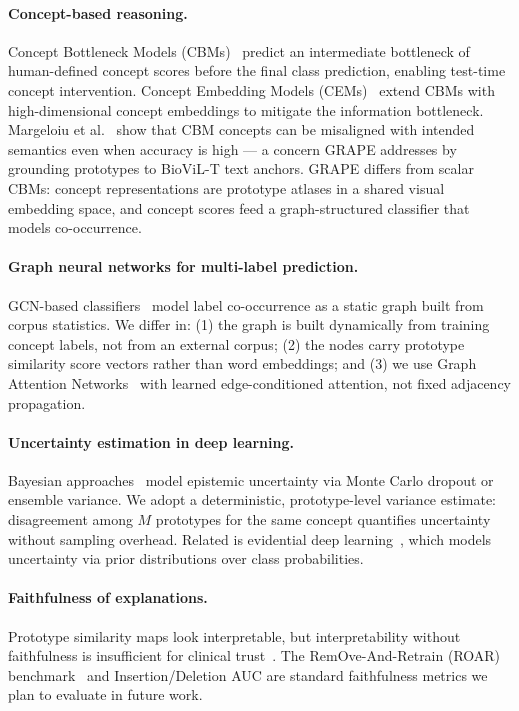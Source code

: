 \documentclass{article}
\begin{document}
\paragraph{Concept-based reasoning.}
Concept Bottleneck Models (CBMs)~\cite{koh2020concept} predict an intermediate bottleneck of human-defined concept scores before the final class prediction, enabling test-time concept intervention.
Concept Embedding Models (CEMs)~\cite{espinosa2022cem} extend CBMs with high-dimensional concept embeddings to mitigate the information bottleneck.
Margeloiu et al.~\cite{margeloiu2021cbm} show that CBM concepts can be misaligned with intended semantics even when accuracy is high — a concern GRAPE addresses by grounding prototypes to BioViL-T text anchors.
GRAPE differs from scalar CBMs: concept representations are prototype atlases in a shared visual embedding space, and concept scores feed a graph-structured classifier that models co-occurrence.

\paragraph{Graph neural networks for multi-label prediction.}
GCN-based classifiers~\cite{chen2019multilabel,ye2020attention} model label co-occurrence as a static graph built from corpus statistics. We differ in: (1) the graph is built dynamically from training concept labels, not from an external corpus; (2) the nodes carry prototype similarity score vectors rather than word embeddings; and (3) we use Graph Attention Networks~\cite{velickovic2018graph} with learned edge-conditioned attention, not fixed adjacency propagation.

\paragraph{Uncertainty estimation in deep learning.}
Bayesian approaches~\cite{gal2016dropout,lakshminarayanan2017simple} model epistemic uncertainty via Monte Carlo dropout or ensemble variance. We adopt a deterministic, prototype-level variance estimate: disagreement among $M$ prototypes for the same concept quantifies uncertainty without sampling overhead. Related is evidential deep learning~\cite{sensoy2018evidential}, which models uncertainty via prior distributions over class probabilities.

\paragraph{Faithfulness of explanations.}
Prototype similarity maps look interpretable, but interpretability without faithfulness is insufficient for clinical trust~\cite{stammer2021right}.
The RemOve-And-Retrain (ROAR) benchmark~\cite{hooker2019roar} and Insertion/Deletion AUC are standard faithfulness metrics we plan to evaluate in future work.
\end{document}
